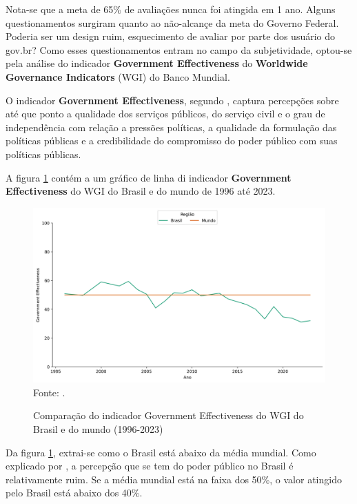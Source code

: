 Nota-se que a meta de 65\% de avaliações nunca foi atingida em 1 ano. Alguns questionamentos surgiram quanto ao não-alcançe da meta do Governo Federal. Poderia ser um design ruim, esquecimento de avaliar por parte dos usuário do gov.br? Como esses questionamentos entram no campo da subjetividade, optou-se pela análise do indicador \textbf{Government Effectiveness} do \textbf{Worldwide Governance Indicators} (WGI) do Banco Mundial.

O indicador \textbf{Government Effectiveness}, segundo \cite{kaufmann2024worldwide}, captura percepções sobre até que ponto a qualidade dos serviços públicos, do serviço civil e o grau de independência com relação a pressões políticas, a qualidade da formulação das políticas públicas e a credibilidade do compromisso do poder público com suas políticas públicas.

A figura \ref{fig:comparacao_wgi_ge_brasil_mundo} contém a um gráfico de linha di indicador \textbf{Government Effectiveness} do WGI do Brasil e do mundo de 1996 até 2023.

\begin{figure}[H]
	\centering
	\caption{Comparação do indicador Government Effectiveness do WGI do Brasil e do mundo (1996-2023)}
	\includegraphics[width=1\linewidth]{figuras/comparacao_wgi_ge_brasil_mundo}
	\label{fig:comparacao_wgi_ge_brasil_mundo}
	\footnotesize{Fonte: \cite{wgi_dados}.}
\end{figure}

Da figura \ref{fig:comparacao_wgi_ge_brasil_mundo}, extrai-se como o Brasil está abaixo da média mundial. Como explicado por \cite{kaufmann2024worldwide}, a percepção que se tem do poder público no Brasil é relativamente ruim. Se a média mundial está na faixa dos 50\%, o valor atingido pelo Brasil está abaixo dos 40\%.

